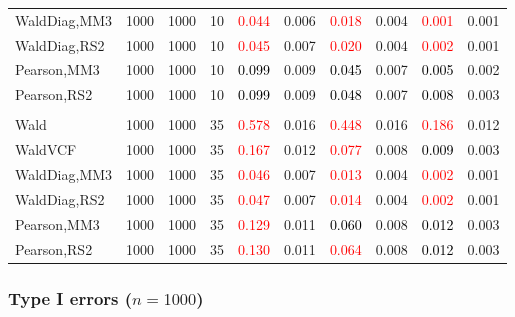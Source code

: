 \documentclass[
]{article}
\begin{document}
\begin{table}[H]
{\begin{tabular}[t]{lrrrrrrlrr}
\hspace{1em}WaldDiag,MM3 & 1000 & 1000 & 10 & \textcolor{red}{0.044} & 0.006 & \textcolor{red}{0.018} & 0.004 & \textcolor{red}{0.001} & 0.001\\
\hspace{1em}WaldDiag,RS2 & 1000 & 1000 & 10 & \textcolor{red}{0.045} & 0.007 & \textcolor{red}{0.020} & 0.004 & \textcolor{red}{0.002} & 0.001\\
\hspace{1em}Pearson,MM3 & 1000 & 1000 & 10 & \textcolor{black}{0.099} & 0.009 & \textcolor{black}{0.045} & 0.007 & \textcolor{black}{0.005} & 0.002\\
\hspace{1em}Pearson,RS2 & 1000 & 1000 & 10 & \textcolor{black}{0.099} & 0.009 & \textcolor{black}{0.048} & 0.007 & \textcolor{black}{0.008} & 0.003\\
\addlinespace[0.3em]
\multicolumn{10}{l}{\textbf{3F 15V}}\\
\hspace{1em}Wald & 1000 & 1000 & 35 & \textcolor{red}{0.578} & 0.016 & \textcolor{red}{0.448} & 0.016 & \textcolor{red}{0.186} & 0.012\\
\hspace{1em}WaldVCF & 1000 & 1000 & 35 & \textcolor{red}{0.167} & 0.012 & \textcolor{red}{0.077} & 0.008 & \textcolor{black}{0.009} & 0.003\\
\hspace{1em}WaldDiag,MM3 & 1000 & 1000 & 35 & \textcolor{red}{0.046} & 0.007 & \textcolor{red}{0.013} & 0.004 & \textcolor{red}{0.002} & 0.001\\
\hspace{1em}WaldDiag,RS2 & 1000 & 1000 & 35 & \textcolor{red}{0.047} & 0.007 & \textcolor{red}{0.014} & 0.004 & \textcolor{red}{0.002} & 0.001\\
\hspace{1em}Pearson,MM3 & 1000 & 1000 & 35 & \textcolor{red}{0.129} & 0.011 & \textcolor{black}{0.060} & 0.008 & \textcolor{black}{0.012} & 0.003\\
\hspace{1em}Pearson,RS2 & 1000 & 1000 & 35 & \textcolor{red}{0.130} & 0.011 & \textcolor{red}{0.064} & 0.008 & \textcolor{black}{0.012} & 0.003\\
\bottomrule
\end{tabular}}
\endgroup{}
\end{table}

\hypertarget{type-i-errors-n1000-3}{%
\subsubsection{\texorpdfstring{Type I errors
(\(n=1000\))}{Type I errors (n=1000)}}\label{type-i-errors-n1000-3}}
\end{document}
